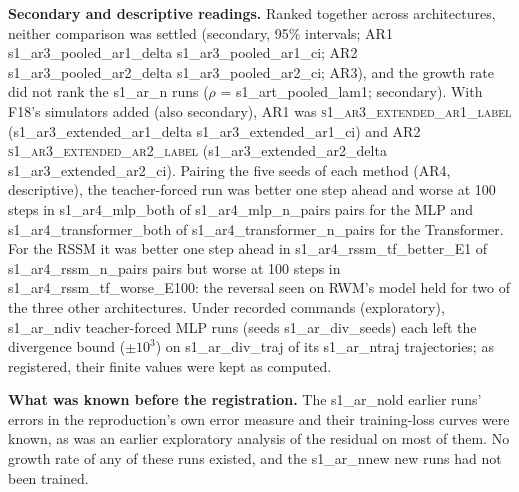 \textbf{Secondary and descriptive readings.} Ranked together across architectures, neither comparison was settled
(secondary, 95\% intervals; AR1 {{s1_ar3_pooled_ar1_delta}} {{s1_ar3_pooled_ar1_ci}}; AR2 {{s1_ar3_pooled_ar2_delta}} {{s1_ar3_pooled_ar2_ci}};
AR3), and the growth rate did not rank the {{s1_ar_n}} runs ($\rho$ = {{s1_art_pooled_lam1}}; secondary). With F18's simulators added (also secondary), AR1 was
\textsc{{{s1_ar3_extended_ar1_label}}} ({{s1_ar3_extended_ar1_delta}} {{s1_ar3_extended_ar1_ci}}) and AR2
\textsc{{{s1_ar3_extended_ar2_label}}} ({{s1_ar3_extended_ar2_delta}} {{s1_ar3_extended_ar2_ci}}). Pairing the five
seeds of each method (AR4, descriptive), the teacher-forced run was better one step ahead and worse at 100 steps in
{{s1_ar4_mlp_both}} of {{s1_ar4_mlp_n_pairs}} pairs for the MLP and {{s1_ar4_transformer_both}} of
{{s1_ar4_transformer_n_pairs}} for the Transformer. For the RSSM it was better one step ahead in
{{s1_ar4_rssm_tf_better_E1}} of {{s1_ar4_rssm_n_pairs}} pairs but worse at 100 steps in {{s1_ar4_rssm_tf_worse_E100}}:
the reversal seen on RWM's model held for two of the three other architectures. Under recorded commands (exploratory),
{{s1_ar_ndiv}} teacher-forced MLP runs (seeds {{s1_ar_div_seeds}}) each left the divergence bound ($\pm10^3$) on {{s1_ar_div_traj}} of
its {{s1_ar_ntraj}} trajectories; as registered, their finite values were kept as computed.

\textbf{What was known before the registration.} The {{s1_ar_nold}} earlier runs' errors in the reproduction's own
error measure and their training-loss curves were known, as was an earlier exploratory analysis of the residual on
most of them. No
growth rate of any of these runs existed, and the {{s1_ar_nnew}} new runs had not been trained.

\FloatBarrier

